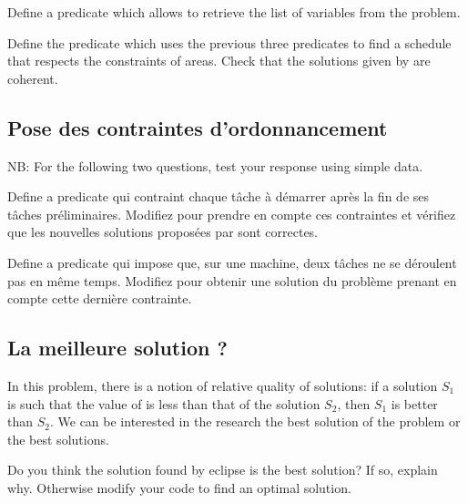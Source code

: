 \begin{question}
Define a predicate  which allows to retrieve the list of variables from the problem.
\end{question}

\begin{question}
Define the predicate  which uses the previous three predicates to find a schedule that respects the constraints of areas. Check that the solutions given by \eclipse{} are coherent.   
\end{question}

\subsection{Pose des contraintes d'ordonnancement}

NB: For the following two questions, test your
response using simple data.

\begin{question}
Define a predicate  qui contraint chaque tâche à démarrer après la fin de ses
tâches préliminaires. Modifiez  pour prendre en compte ces contraintes et vérifiez que les nouvelles solutions proposées par \eclipse{} sont correctes.
\end{question}

\begin{question} \label{TP2_Q4}
Define a predicate qui impose que, sur une machine, deux tâches ne se déroulent
pas en même temps. Modifiez  pour obtenir une solution du problème prenant en compte cette dernière contrainte.
\end{question}

\subsection{La meilleure solution ?}

In this problem, there is a notion of relative quality of
solutions: if a solution $S_1$ is such that the value of
 is less than that of the solution $S_2$, then $S_1$
is better than $S_2$.  We can be interested in the research
the best solution of the problem or the best
solutions.
\begin{question} \label{TP2_last}
 Do you think the solution found by eclipse is the best solution? If so, explain why. Otherwise modify your code to find an optimal solution.
\end{question}


